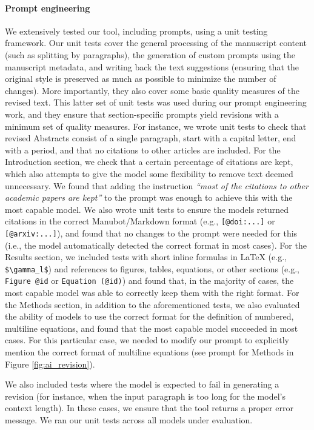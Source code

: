 \documentclass[
]{article}
\begin{document}
\paragraph{Prompt engineering}

We extensively tested our tool, including prompts, using a unit testing framework.
Our unit tests cover the general processing of the manuscript content (such as splitting by paragraphs), the generation of custom prompts using the manuscript metadata, and writing back the text suggestions (ensuring that the original style is preserved as much as possible to minimize the number of changes).
More importantly, they also cover some basic quality measures of the revised text.
This latter set of unit tests was used during our prompt engineering work, and they ensure that section-specific prompts yield revisions with a minimum set of quality measures.
For instance, we wrote unit tests to check that revised Abstracts consist of a single paragraph, start with a capital letter, end with a period, and that no citations to other articles are included.
For the Introduction section, we check that a certain percentage of citations are kept, which also attempts to give the model some flexibility to remove text deemed unnecessary.
We found that adding the instruction \emph{``most of the citations to other academic papers are kept''} to the prompt was enough to achieve this with the most capable model.
We also wrote unit tests to ensure the models returned citations in the correct Manubot/Markdown format (e.g., \texttt{{[}@doi:...{]}} or \texttt{{[}@arxiv:...{]}}), and found that no changes to the prompt were needed for this (i.e., the model automatically detected the correct format in most cases).
For the Results section, we included tests with short inline formulas in LaTeX (e.g., \texttt{\$\textbackslash{}gamma\_l\$}) and references to figures, tables, equations, or other sections (e.g., \texttt{Figure\ @id} or \texttt{Equation\ (@id)}) and found that, in the majority of cases, the most capable model was able to correctly keep them with the right format.
For the Methods section, in addition to the aforementioned tests, we also evaluated the ability of models to use the correct format for the definition of numbered, multiline equations, and found that the most capable model succeeded in most cases.
For this particular case, we needed to modify our prompt to explicitly mention the correct format of multiline equations (see prompt for Methods in Figure \ref{fig:ai_revision}).

We also included tests where the model is expected to fail in generating a revision (for instance, when the input paragraph is too long for the model's context length).
In these cases, we ensure that the tool returns a proper error message.
We ran our unit tests across all models under evaluation.
\end{document}
